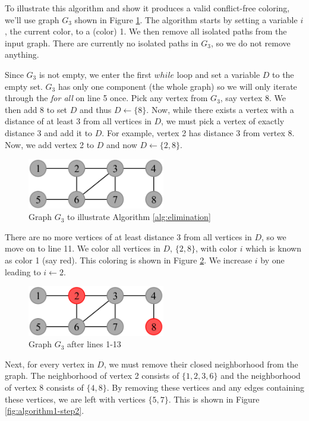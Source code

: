 \documentclass{sig-alternate}
\begin{document}
To illustrate this algorithm and show it produces a valid conflict-free coloring, we'll use graph $G_3$ shown in Figure \ref{fig:algorithm1}. The algorithm starts by setting a variable $i$, the current color, to a (color) 1. We then remove all isolated paths from the input graph. There are currently no isolated paths in $G_3$, so we do not remove anything.

Since $G_3$ is not empty, we enter the first $while$ loop and set a variable $D$ to the empty set. $G_3$ has only one component (the whole graph) so we will only iterate through the \emph{for all} on line 5 once. Pick any vertex from $G_3$, say vertex 8. We then add 8 to set $D$ and thus $D \gets \{8\}$. Now, while there exists a vertex with a distance of at least 3 from all vertices in $D$, we must pick a vertex of exactly distance 3 and add it to $D$. For example, vertex 2 has distance 3 from vertex 8. Now, we add vertex 2 to $D$ and now $D \gets \{2, 8\}$.

\begin{figure}[h]
	\centering
	\includegraphics[width=6cm]{../figures/algorithm1.pdf}
	\caption{Graph $G_3$ to illustrate Algorithm \ref{alg:elimination}}\label{fig:algorithm1}
\end{figure}

There are no more vertices of at least distance 3 from all vertices in $D$, so we move on to line 11. We color all vertices in $D$, $\{2,8\}$, with color $i$ which is known as color 1 (say red). This coloring is shown in Figure \ref{fig:algorithm1-step1}. We increase $i$ by one leading to $i \gets 2$.

\begin{figure}[h]
	\centering
	\includegraphics[width=6cm]{../figures/algorithm1-step1.pdf}
	\caption{Graph $G_3$ after lines 1-13}\label{fig:algorithm1-step1}
\end{figure}

Next, for every vertex in $D$, we must remove their closed neighborhood from the graph. The neighborhood of vertex 2 consists of $\{1,2,3,6\}$ and the neighborhood of vertex 8 consists of $\{4,8\}$. By removing these vertices and any edges containing these vertices, we are left with vertices $\{5, 7\}$. This is shown in Figure \ref{fig:algorithm1-step2}.
\end{document}
